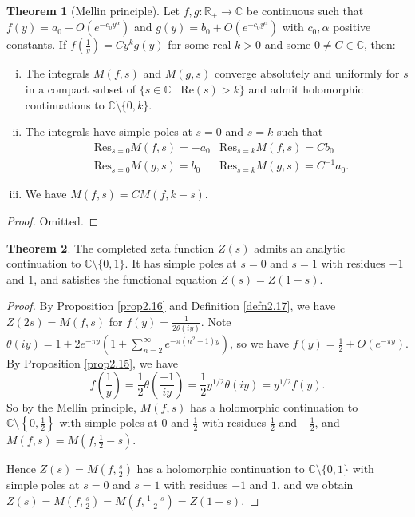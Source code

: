 \documentclass{article}
\theoremstyle{definition}
\newtheorem{theorem}{Theorem}[section]
\begin{document}
\begin{theorem}[Mellin principle]\label{theorem2.18}
    Let $f,g : \mathbb{R}_+ \to \mathbb{C}$ be continuous such that $f(y) = a_0 + O(e^{-c_0 y^{\alpha}})$ and $g(y) = b_0 + O(e^{-c_0 y^{\alpha}})$ with $c_0, \alpha$ positive constants. If $f \left(\frac{1}{y}\right) = Cy^k g(y)$ for some real $k>0$ and some $0 \neq C \in \mathbb{C}$, then:
    \begin{enumerate}[(i)]
        \item The integrals $M(f,s)$ and $M(g,s)$ converge absolutely and uniformly for $s$ in a compact subset of $\{s \in \mathbb{C} \mid  \text{Re}(s)>k\}$ and admit holomorphic continuations to $\mathbb{C} \setminus  \{0,k\}$.
        \item The integrals have simple poles at $s=0$ and $s=k$ such that 
        \begin{align*}
            &\text{Res}_{s=0} M(f,s) = - a_0 &\text{Res}_{s=k} M(f,s) = C b_0\\
            &\text{Res}_{s=0} M(g,s) = b_0 &\text{Res}_{s=k} M(g,s) = C^{-1} a_0.
        \end{align*}
        \item We have $M(f,s) = C M(f,k-s)$.
    \end{enumerate}
\end{theorem}
\begin{proof}
    Omitted.
\end{proof}
\begin{theorem}\label{theorem2.19}
    The completed zeta function $Z(s)$ admits an analytic continuation to $\mathbb{C}\setminus \{0,1\}$. It has simple poles at $s=0$ and $s=1$ with residues $-1$ and $1$, and satisfies the functional equation $Z(s)=Z(1-s)$.
\end{theorem}
\begin{proof}
    By Proposition \ref{prop2.16} and Definition \ref{defn2.17}, we have $Z(2s) = M(f,s)$ for $f(y) = \frac{1}{2\theta(iy)}$. Note $\theta(iy) = 1 + 2e^{-\pi y}(1+ \sum_{n=2}^{\infty} e^{-\pi(n^2-1)y})$, so we have $f(y) =\frac{1}{2} + O(e^{-\pi y})$. By Proposition \ref{prop2.15}, we have $$f \left(\frac{1}{y}\right) = \frac{1}{2}\theta(\frac{-1}{iy}) = \frac{1}{2}y^{1/2}\theta(iy) = y^{1/2}f(y).$$ So by the Mellin principle, $M(f,s)$ has a holomorphic continuation to $\mathbb{C}\setminus \left\{0,\frac{1}{2}\right\}$ with simple poles at $0$ and $\frac{1}{2}$ with residues $\frac{1}{2}$ and $-\frac{1}{2}$, and $M(f,s) = M(f,\frac{1}{2}-s)$. 
    
    \vspace{1mm}
     
    Hence $Z(s) = M\left(f,\frac{s}{2}\right)$ has a holomorphic continuation to $\mathbb{C} \setminus \{0,1\}$ with simple poles at $s=0$ and $s=1$ with residues $-1$ and $1$, and we obtain $Z(s) = M\left(f,\frac{s}{2}\right) = M \left(f, \frac{1-s}{2}\right) = Z(1-s)$.
\end{proof}
\end{document}

